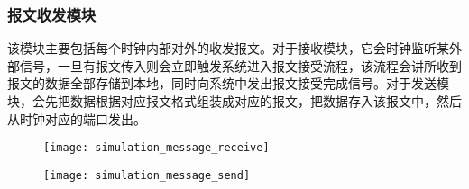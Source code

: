 \subsubsection{报文收发模块}
该模块主要包括每个时钟内部对外的收发报文。对于接收模块，它会时钟监听某外部信号，一旦有报文传入则会立即触发系统进入报文接受流程，该流程会讲所收到报文的数据全部存储到本地，同时向系统中发出报文接受完成信号。对于发送模块，会先把数据根据对应报文格式组装成对应的报文，把数据存入该报文中，然后从时钟对应的端口发出。
\begin{figure}[!hbp]
  \centering
  \begin{minipage}[b]{1\textwidth}
    \captionstyle{\centering}
    \centering
    \texttt{[image: simulation\_message\_receive]}
  \end{minipage}     
\end{figure}
\begin{figure}[!hbp]
  \centering
  \begin{minipage}[b]{1\textwidth}
    \captionstyle{\centering}
    \centering
    \texttt{[image: simulation\_message\_send]}
  \end{minipage}     
\end{figure}

